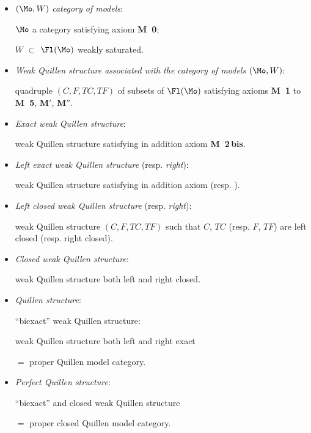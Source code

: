 \begin{itemize}
\item[\textbullet] $(\Mo,W)$ \textit{category of models}:

$\Mo$ a category satisfying axiom \textbf{M~0};

$W$ $\subset$ $\Fl(\Mo)$ weakly saturated.

\item[\textbullet] \textit{Weak Quillen structure associated with the category of models} $(\Mo,W)$:

quadruple $(C,F,TC,TF)$ of subsets of $\Fl(\Mo)$ satisfying axioms \textbf{M~1} to \textbf{M~5}, $\mathbf{M}'$, $\mathbf{M}''$.

\item[\textbullet] \textit{Exact weak Quillen structure}:

weak Quillen structure satisfying in addition axiom \textbf{M~2\,bis}.

\item[\textbullet] \textit{Left exact weak Quillen structure} (resp. \textit{right}):

weak Quillen structure satisfying in addition axiom \Mzg{} (resp. \Mzd).
\end{itemize}


\begin{itemize}
\item[\textbullet] \textit{Left closed weak Quillen structure} (resp. \textit{right}):

weak Quillen structure $(C,F,TC,TF)$ such that $C$, $TC$ (resp. $F$, $TF$) are left closed (resp. right closed).

\item[\textbullet] \textit{Closed weak Quillen structure}:

weak Quillen structure both left and right closed.

\item[\textbullet] \textit{Quillen structure}:

``biexact'' weak Quillen structure:

weak Quillen structure both left and right exact

$=$ proper Quillen model category.

\item[\textbullet] \textit{Perfect Quillen structure}:

``biexact'' and closed weak Quillen structure

$=$ proper closed Quillen model category.
\end{itemize}

